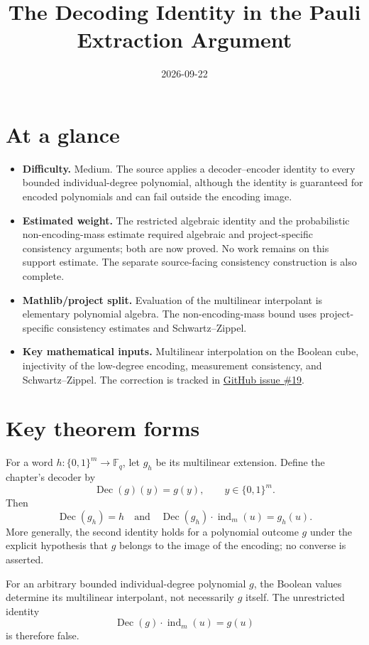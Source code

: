 \documentclass[11pt]{article}
\title{The Decoding Identity in the Pauli Extraction Argument}
\author{}
\date{2026-09-22}
\renewcommand{\ghissue}[1]{%
  \href{https://github.com/Dengnifer/MIPStarRE-QPBT/issues/#1}{GitHub issue \##1}}
\begin{document}
\maketitle

\section{At a glance}

\begin{itemize}
  \item \textbf{Difficulty.} Medium.  The source applies a decoder--encoder
  identity to every bounded individual-degree polynomial, although the identity
  is guaranteed for encoded polynomials and can fail outside the encoding image.
  \item \textbf{Estimated weight.} The restricted algebraic identity and the
  probabilistic non-encoding-mass estimate required algebraic and
  project-specific consistency arguments; both are now proved. No work
  remains on this support estimate. The separate source-facing consistency
  construction is also complete.
  \item \textbf{Mathlib/project split.} Evaluation of the multilinear
  interpolant is elementary polynomial algebra.  The non-encoding-mass bound
  uses project-specific consistency estimates and Schwartz--Zippel.
  \item \textbf{Key mathematical inputs.} Multilinear interpolation on the
  Boolean cube, injectivity of the low-degree encoding, measurement
  consistency, and Schwartz--Zippel.  The correction is tracked in
  \ghissue{19}.
\end{itemize}

\section{Key theorem forms}

For a word $h\colon\{0,1\}^m\to\mathbb F_q$, let $g_h$ be its multilinear
extension.  Define the chapter's decoder by
\[
  \operatorname{Dec}(g)(y)=g(y),
  \qquad y\in\{0,1\}^m.
\]
Then
\[
  \operatorname{Dec}(g_h)=h
  \quad\text{and}\quad
  \operatorname{Dec}(g_h)\mathbin{\cdot}\operatorname{ind}_m(u)=g_h(u).
\]
More generally, the second identity holds for a polynomial outcome $g$ under
the explicit hypothesis that $g$ belongs to the image of the encoding; no
converse is asserted.

For an arbitrary bounded individual-degree polynomial $g$, the Boolean values
determine its multilinear interpolant, not necessarily $g$ itself.  The
unrestricted identity
\[
  \operatorname{Dec}(g)\mathbin{\cdot}\operatorname{ind}_m(u)=g(u)
\]
is therefore false.
\end{document}
